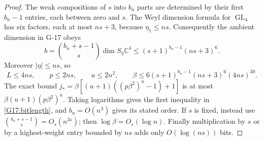 \begin{proof}
The weak compositions of $s$ into $b_n$ parts are determined by their
first $b_n-1$ entries, each between zero and $s$. The Weyl dimension
formula for $\operatorname{GL}_4$ has six factors, each at most $ns+3$,
because $\eta_1\leq ns$. Consequently the ambient dimension in G-17 obeys
\[
 b=\binom{b_n+s-1}{s}\dim S_\eta\mathbb C^4
   \leq(s+1)^{b_n-1}(ns+3)^6.
\]
Moreover $|\eta|\leq ns$, so
\[
 L\leq4ns,\qquad p\leq2ns,\qquad u\leq2n^2,
 \qquad
 \beta\leq6(s+1)^{b_n-1}(ns+3)^6(4ns)^{30}.
\]
The exact bound
$j_*=\beta[(u+1)((p\beta^2)^u-1)+1]$
is at most $\beta(u+1)(p\beta^2)^u$. Taking logarithms gives
the first inequality in \eqref{G17:bitlength}, and $b_n=O(n^3)$
gives its stated order. If $s$ is fixed, instead use
$\binom{b_n+s-1}{s}=O_s(n^{3s})$; then $\log\beta=O_s(\log n)$.
Finally multiplication by $s$ or by a highest-weight entry bounded
by $ns$ adds only $O(\log(ns))$ bits.
\end{proof}


